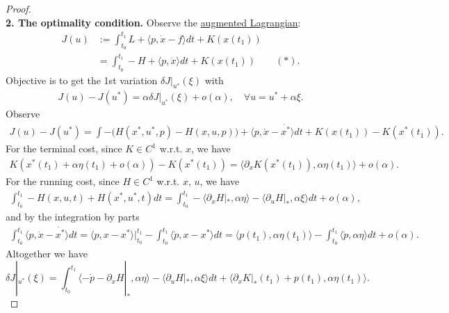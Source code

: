 \begin{proof}
\quad\\
\textbf{2. The optimality condition. }
Observe the \underline{augmented Lagrangian}:
\begin{equation}
\begin{aligned}
	J(u)&:= \int_{t_0}^{t_1} L +  \langle p , \dot{x} - f \rangle  dt + K(x(t_1)) \\
	&= \int_{t_0}^{t_1} - H + \langle p, \dot{x} \rangle dt + K(x(t_1)) \qquad(*).
	\end{aligned}
\end{equation}
Objective is to get the 1st variation $\delta J|_{u^*}(\xi)$ with
\begin{align*}
	J(u) - J(u^*) = \alpha \delta J|_{u^*}(\xi) + o(\alpha), \quad \forall u = u^* + \alpha \xi .
\end{align*}
Observe 
\begin{align*}
	J(u) - J(u^*) = \int -\bigg( H(x^*, u^*, p) - H(x, u, p) \bigg) + \langle p, \dot{x} - \dot{x^*} \rangle dt + K(x(t_1)) - K(x^*(t_1)). 
\end{align*}
For the terminal cost, since $K \in C^1$ w.r.t. $x$, we have
\begin{align*}
	K(x^*(t_1) + \alpha \eta(t_1) + o(\alpha)) - K(x^*(t_1)) = \langle \partial_x K(x^*(t_1)),   \alpha \eta(t_1) \rangle  + o(\alpha).
\end{align*}
For the running cost, since $H \in C^1$ w.r.t. $x$, $u$, we have
\begin{align*}
	\int_{t_0}^{t_1} -H(x, u, t) + H(x^*, u^*, t)dt =  \int_{t_0}^{t_1}-  \langle \partial_xH|_*, \alpha \eta  \rangle - \langle \partial_u H|_*, \alpha \xi  \rangle dt + o(\alpha) ,
\end{align*}
and by the integration by parts
\begin{align*}
	\int_{t_0}^{t_1} \langle p , \dot{x} - \dot{x^*} \rangle dt = \langle p, x - x^* \rangle\bigg|_{t_0}^{t_1} - \int_{t_0}^{t_1} \langle \dot{p}, x - x^* \rangle dt = \langle p(t_1), \alpha \eta(t_1) \rangle - \int_{t_0}^{t_1} \langle \dot{p}, \alpha \eta \rangle dt + o(\alpha). 
\end{align*}
Altogether we have
\begin{equation}
	\delta J|_{u^*}(\xi) = \int_{t_0}^{t_1} \langle -\dot{p} - \partial_x H|_*, \alpha \eta \rangle - \langle \partial_u H|_*, \alpha\xi \rangle dt + \langle \partial_xK|_*(t_1) + p(t_1), \alpha \eta(t_1) \rangle.
\end{equation}
\end{proof}



